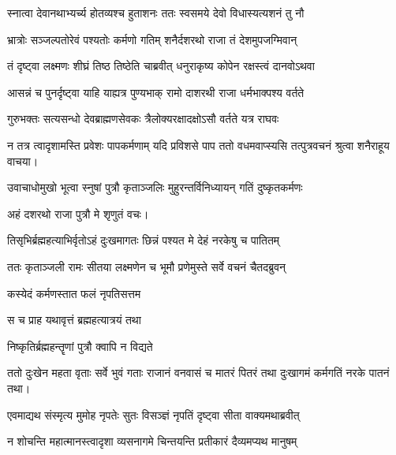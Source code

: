 \twolineshloka
{स्नात्वा देवानथाभ्यर्च्य होतव्यश्च हुताशनः}
{ततः स्वसमये देवो विधास्यत्यशनं तु नौ} %



\twolineshloka
{भ्रात्रोः सञ्जल्पतोरेवं पश्यतोः कर्मणो गतिम्}
{शनैर्दशरथो राजा तं देशमुपजग्मिवान्} %

\twolineshloka
{तं दृष्ट्वा लक्ष्मणः शीघ्रं तिष्ठ तिष्ठेति चाब्रवीत्}
{धनुराकृष्य कोपेन रक्षस्त्वं दानवोऽथवा} %

\twolineshloka
{आसन्नं च पुनर्दृष्ट्वा याहि याह्यत्र पुण्यभाक्}
{रामो दाशरथी राजा धर्मभाक्पश्य वर्तते} %

\twolineshloka
{गुरुभक्तः सत्यसन्धो देवब्राह्मणसेवकः}
{त्रैलोक्यरक्षादक्षोऽसौ वर्तते यत्र राघवः} %

\twolineshloka
{न तत्र त्वादृशामस्ति प्रवेशः पापकर्मणाम्}
{यदि प्रविशसे पाप ततो वधमवाप्स्यसि} %
तत्पुत्रवचनं श्रुत्वा शनैराहूय वाचया।

\twolineshloka
{उवाचाधोमुखो भूत्वा स्नुषां पुत्रौ कृताञ्जलिः}
{मुहुरन्तर्विनिध्यायन् गतिं दुष्कृतकर्मणः} %


अहं दशरथो राजा पुत्रौ मे शृणुतं वचः।

\twolineshloka
{तिसृभिर्ब्रह्महत्याभिर्वृतोऽहं दुःखमागतः}
{छिन्नं पश्यत मे देहं नरकेषु च पातितम्} %



\twolineshloka
{ततः कृताञ्जली रामः सीतया लक्ष्मणेन च}
{भूमौ प्रणेमुस्ते सर्वे वचनं चैतदब्रुवन्} %



\onelineshloka
{कस्येदं कर्मणस्तात फलं नृपतिसत्तम}%



\onelineshloka
{स च प्राह यथावृत्तं ब्रह्महत्यात्रयं तथा}%



\onelineshloka
{निष्कृतिर्ब्रह्महन्तॄणां पुत्रौ क्वापि न विद्यते}%



\twolineshloka
{ततो दुःखेन महता वृताः सर्वे भुवं गताः}
{राजानं वनवासं च मातरं पितरं तथा} %
दुःखागमं कर्मगतिं नरके पातनं तथा।

\twolineshloka
{एवमाद्यथ संस्मृत्य मुमोह नृपतेः सुतः}
{विसञ्ज्ञं नृपतिं दृष्ट्वा सीता वाक्यमथाब्रवीत्} %



\twolineshloka
{न शोचन्ति महात्मानस्त्वादृशा व्यसनागमे}
{चिन्तयन्ति प्रतीकारं दैव्यमप्यथ मानुषम्} %

